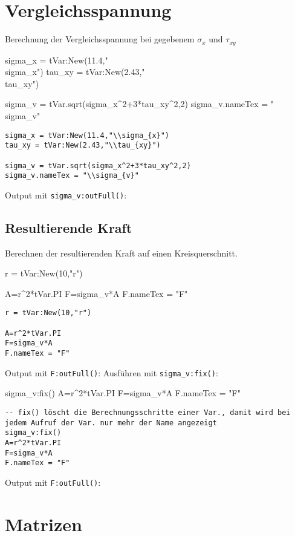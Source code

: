 \section{Vergleichsspannung}
Berechnung der Vergleichsspannung bei gegebenem $\sigma_{x}$ und $\tau_{xy}$
\begin{luacode*}
	sigma_x = tVar:New(11.4,"\\sigma_{x}")
	tau_xy = tVar:New(2.43,"\\tau_{xy}")
	
	sigma_v = tVar.sqrt(sigma_x^2+3*tau_xy^2,2)
	sigma_v.nameTex = "\\sigma_{v}"
\end{luacode*}
\begin{lstlisting}
sigma_x = tVar:New(11.4,"\\sigma_{x}")
tau_xy = tVar:New(2.43,"\\tau_{xy}")

sigma_v = tVar.sqrt(sigma_x^2+3*tau_xy^2,2)
sigma_v.nameTex = "\\sigma_{v}"
\end{lstlisting}
Output mit \lstinline{sigma_v:outFull()}:
\subsection{Resultierende Kraft}
Berechnen der resultierenden Kraft auf einen Kreisquerschnitt.
\begin{luacode*}
	r = tVar:New(10,"r")

	A=r^2*tVar.PI
	F=sigma_v*A
	F.nameTex = "F"
\end{luacode*}
\begin{lstlisting}
r = tVar:New(10,"r")

A=r^2*tVar.PI
F=sigma_v*A
F.nameTex = "F"
\end{lstlisting}
Output mit \lstinline{F:outFull()}:
Ausführen mit \lstinline{sigma_v:fix()}:
\begin{luacode*}
	sigma_v:fix()
	A=r^2*tVar.PI
	F=sigma_v*A
	F.nameTex = "F"
\end{luacode*}
\begin{lstlisting}
-- fix() löscht die Berechnungsschritte einer Var., damit wird bei jedem Aufruf der Var. nur mehr der Name angezeigt
sigma_v:fix()
A=r^2*tVar.PI
F=sigma_v*A
F.nameTex = "F"
\end{lstlisting}
Output mit \lstinline{F:outFull()}:
\section{Matrizen}
